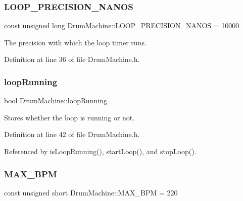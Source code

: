 \subsubsection{\texorpdfstring{L\+O\+O\+P\+\_\+\+P\+R\+E\+C\+I\+S\+I\+O\+N\+\_\+\+N\+A\+N\+OS}{LOOP\_PRECISION\_NANOS}}
{\footnotesize\ttfamily const unsigned long Drum\+Machine\+::\+L\+O\+O\+P\+\_\+\+P\+R\+E\+C\+I\+S\+I\+O\+N\+\_\+\+N\+A\+N\+OS = 10000\hspace{0.3cm}{\ttfamily [private]}}



The precision with which the loop timer runs. 



Definition at line 36 of file Drum\+Machine.\+h.

\mbox{\label{class_drum_machine_a4ac5a8c113e5a32a557f069e8d93cca8}} 
\subsubsection{\texorpdfstring{loop\+Running}{loopRunning}}
{\footnotesize\ttfamily bool Drum\+Machine\+::loop\+Running\hspace{0.3cm}{\ttfamily [private]}}



Stores whether the loop is running or not. 



Definition at line 42 of file Drum\+Machine.\+h.



Referenced by is\+Loop\+Running(), start\+Loop(), and stop\+Loop().

\mbox{\label{class_drum_machine_a0b64f2e265bb9fc06729090b7e05c005}} 
\subsubsection{\texorpdfstring{M\+A\+X\+\_\+\+B\+PM}{MAX\_BPM}}
{\footnotesize\ttfamily const unsigned short Drum\+Machine\+::\+M\+A\+X\+\_\+\+B\+PM = 220\hspace{0.3cm}{\ttfamily [private]}}



